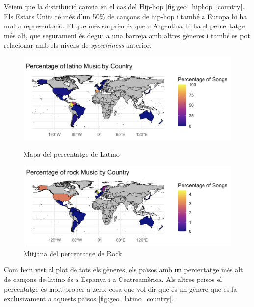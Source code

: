 Veiem que la distribució canvia en el cas del Hip-hop \ref{fig:geo_hiphop_country}. Els Estats Units té més d'un 50\% de cançons de hip-hop i també a Europa hi ha molta representació. El que més sorprèn és que a Argentina hi ha el percentatge més alt, que segurament és degut a una barreja amb altres gèneres i també es pot relacionar amb els nivells de \textit{speechiness} anterior.

\begin{figure}[H]
\centering
    \begin{minipage}{.5\textwidth}
        \centering
        \includegraphics[width=0.99\linewidth]{Images/7_Geospatial/1_descriptive/percent_genere_per_pais/per_latino.png}
        \caption{Mapa del percentatge de Latino}
        \label{fig:geo_latino_country}
    \end{minipage}%
    \begin{minipage}{.5\textwidth}
        \centering
        \includegraphics[width=0.99\linewidth]{Images/7_Geospatial/1_descriptive/percent_genere_per_pais/per_rock.png}
        \caption{Mitjana del percentatge de Rock}
        \label{fig:geo_rock_country}
    \end{minipage}%
\end{figure}

Com hem vist al plot de tots els gèneres, els països amb un percentatge més alt de cançons de latino és a Espanya i a Centreamèrica. Als altres països el percentatge és molt proper a zero, cosa que vol dir que és un gènere que es fa exclusivament a aquests països \ref{fig:geo_latino_country}. \\

